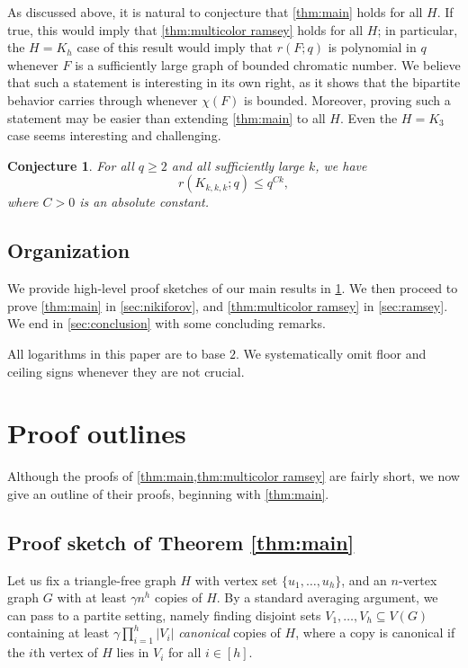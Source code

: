 \documentclass{aic}
\theoremstyle{plain}
\newtheorem{conjecture}[theorem]{Conjecture}
\theoremstyle{remark}
\newcommand\ab[1]{\lvert #1 \rvert}
\begin{document}
As discussed above, it is natural to conjecture that \cref{thm:main} holds for all $H$. If true, this would imply that \cref{thm:multicolor ramsey} holds for all $H$; in particular, the $H=K_h$ case of this result would imply that $r(F;q)$ is polynomial in $q$ whenever $F$ is a sufficiently large graph of bounded chromatic number. We believe that such a statement is interesting in its own right, as it shows that the bipartite behavior carries through whenever $\chi(F)$ is bounded. Moreover, proving such a statement may be easier than extending \cref{thm:main} to all $H$. Even the $H=K_3$ case seems interesting and challenging.
\begin{conjecture}
    For all $q \geq 2$ and all sufficiently large $k$, we have
    \[
        r(K_{k,k,k};q) \leq q^{Ck},
    \]
    where $C>0$ is an absolute constant.
\end{conjecture}

\subsection{Organization}
We provide high-level proof sketches of our main results in \cref{sec:outlines}.
We then proceed to prove \cref{thm:main} in \cref{sec:nikiforov}, and \cref{thm:multicolor ramsey} in \cref{sec:ramsey}. We end in \cref{sec:conclusion} with some concluding remarks.

All logarithms in this paper are to base $2$. We systematically omit floor and ceiling signs whenever they are not crucial.

\section{Proof outlines}\label{sec:outlines}
Although the proofs of \cref{thm:main,thm:multicolor ramsey} are fairly short, we now give an outline of their proofs, beginning with \cref{thm:main}. 
\subsection{Proof sketch of Theorem \ref{thm:main}}
Let us fix a triangle-free graph $H$ with vertex set $\{u_1,\dots,u_h\}$, and an $n$-vertex graph $G$ with at least $\gamma n^h$ copies of $H$. By a standard averaging argument, we can pass to a partite setting, namely finding disjoint sets $V_1,\dots,V_h \subseteq V(G)$ containing at least $\gamma \prod_{i=1}^h \ab{V_i}$ \emph{canonical} copies of $H$, where a copy is canonical if the $i$th vertex of $H$ lies in $V_i$ for all $i \in [h]$.
\end{document}
